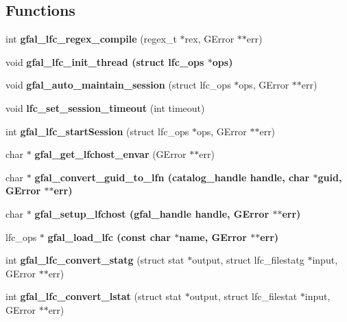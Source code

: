 \subsection*{Functions}
\begin{CompactItemize}
\item 
int \textbf{gfal\_\-lfc\_\-regex\_\-compile} (regex\_\-t $\ast$rex, GError $\ast$$\ast$err)\label{lfc__ifce__ng_8c_4ecadc4bf36b4b23af7beb949f6190be}

\item 
void \bf{gfal\_\-lfc\_\-init\_\-thread} (struct lfc\_\-ops $\ast$ops)
\item 
void \textbf{gfal\_\-auto\_\-maintain\_\-session} (struct lfc\_\-ops $\ast$ops, GError $\ast$$\ast$err)\label{lfc__ifce__ng_8c_9be7f93578b4772ec1498fe197f3c2c4}

\item 
void \textbf{lfc\_\-set\_\-session\_\-timeout} (int timeout)\label{lfc__ifce__ng_8c_656ee4eb29a1bcf4e9e1d9a4aafd4c82}

\item 
int \textbf{gfal\_\-lfc\_\-start\-Session} (struct lfc\_\-ops $\ast$ops, GError $\ast$$\ast$err)\label{lfc__ifce__ng_8c_191824f5c6bfee67e81f0c495e9bb778}

\item 
char $\ast$ \textbf{gfal\_\-get\_\-lfchost\_\-envar} (GError $\ast$$\ast$err)\label{lfc__ifce__ng_8c_9a5b8e8e30853b920e3bbe41062e1d25}

\item 
char $\ast$ \bf{gfal\_\-convert\_\-guid\_\-to\_\-lfn} (catalog\_\-handle handle, char $\ast$guid, GError $\ast$$\ast$err)
\item 
char $\ast$ \bf{gfal\_\-setup\_\-lfchost} (gfal\_\-handle handle, GError $\ast$$\ast$err)
\item 
lfc\_\-ops $\ast$ \bf{gfal\_\-load\_\-lfc} (const char $\ast$name, GError $\ast$$\ast$err)
\item 
int \textbf{gfal\_\-lfc\_\-convert\_\-statg} (struct stat $\ast$output, struct lfc\_\-filestatg $\ast$input, GError $\ast$$\ast$err)\label{lfc__ifce__ng_8c_79cceda78f871c9bd8568a636dd31206}

\item 
int \textbf{gfal\_\-lfc\_\-convert\_\-lstat} (struct stat $\ast$output, struct lfc\_\-filestat $\ast$input, GError $\ast$$\ast$err)\label{lfc__ifce__ng_8c_16e8d4c4177c6e1d39c1850f06042f97}


\end{CompactItemize}
